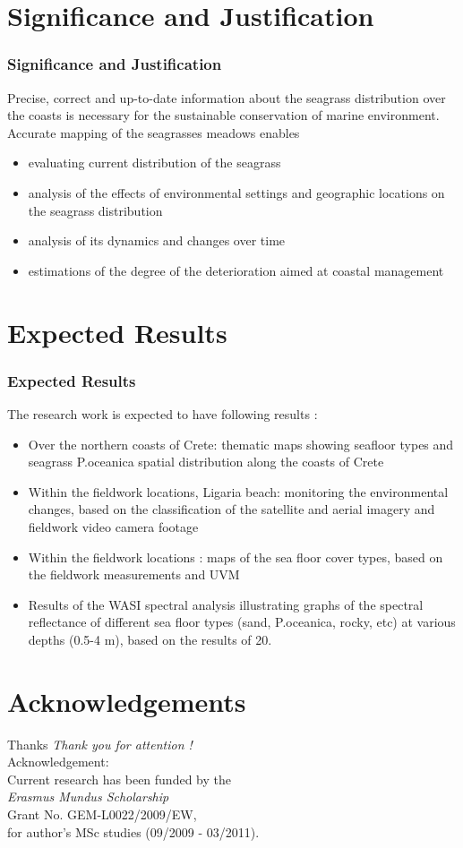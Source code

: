 \documentclass[pdflatex,compress]{beamer}
\begin{document}
\section{Significance and Justification}
\begin{frame}\frametitle{Significance and Justification}
Precise, correct and up-to-date information about the seagrass distribution over the coasts is necessary for the sustainable conservation of marine environment.
Accurate mapping of the seagrasses meadows enables
\begin{itemize}
	\item evaluating current distribution of the seagrass
	\item analysis of the effects of environmental settings and geographic locations on the seagrass distribution
	\item analysis of its dynamics and changes over time
	\item estimations of the degree of the deterioration aimed at coastal management
\end{itemize}
\end{frame}

\section{Expected Results}
\begin{frame}\frametitle{Expected Results}
The research work is expected to have following results :
\begin{itemize}
	\item Over the northern coasts of Crete: thematic maps showing seafloor types and seagrass P.oceanica spatial distribution along the coasts of Crete
	\item Within the fieldwork locations, Ligaria beach: monitoring the environmental changes, based on the classification of the satellite and aerial imagery and fieldwork video camera footage
	\item Within the fieldwork locations : maps of the sea floor cover types, based on the fieldwork measurements and UVM
	\item Results of the WASI spectral analysis illustrating graphs of the spectral reflectance of different sea floor types (sand, P.oceanica, rocky, etc) at various depths (0.5-4 m), based on the results of 20.
\end{itemize}
\end{frame}

\section{Acknowledgements}
\begin{frame}{Thanks}
  	\centering \LARGE 
  	\emph{Thank you for attention !}\\
	\vspace{5em}
\normalsize
Acknowledgement: \\
Current research has been funded by the \\
\emph{Erasmus Mundus Scholarship} \\
Grant No. GEM-L0022/2009/EW, \\
for author's MSc studies (09/2009 - 03/2011).
\end{frame}
\end{document}
